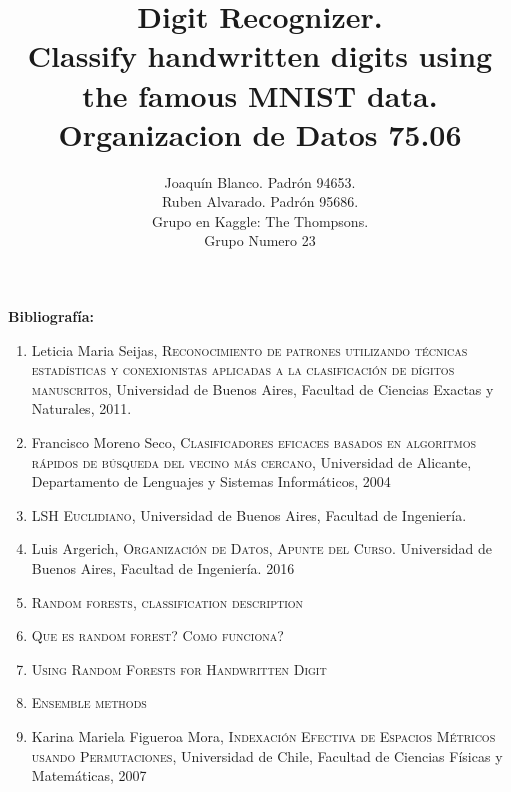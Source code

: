 \documentclass[a4paper,11pt]{report}
\title{Digit Recognizer. \\ 
  Classify handwritten digits using the famous MNIST data.\\
  Organizacion de Datos 75.06}
\author{Joaquín Blanco. Padrón 94653.\\
  Ruben Alvarado. Padrón 95686.\\
  Grupo en Kaggle: The Thompsons.\\
  Grupo Numero 23}
\begin{document}
\maketitle
\tableofcontents







\textbf{Bibliografía:}
\begin{enumerate}
  \item Leticia Maria Seijas, \textsc{Reconocimiento de patrones utilizando técnicas estadísticas y conexionistas aplicadas a la clasificación de dígitos manuscritos}, Universidad de Buenos Aires, Facultad de Ciencias Exactas y Naturales, 2011.
  \item Francisco Moreno Seco, \textsc{Clasificadores eficaces basados en algoritmos rápidos de búsqueda del vecino más cercano}, Universidad de Alicante, Departamento de Lenguajes y Sistemas Informáticos, 2004
  \item \textsc{LSH Euclidiano}, Universidad de Buenos Aires, Facultad de Ingeniería.
  \item Luis Argerich, \textsc{Organización de Datos, Apunte del Curso.} Universidad de Buenos Aires, Facultad de Ingeniería. 2016
  \item \textsc{Random forests, classification description} 
  \item \textsc{Que es random forest? Como funciona?}
  \item \textsc{Using Random Forests for Handwritten Digit}
  \item \textsc{Ensemble methods}
  \item Karina Mariela Figueroa Mora, \textsc{Indexación Efectiva de Espacios Métricos usando Permutaciones}, Universidad de Chile, Facultad de Ciencias Físicas y Matemáticas, 2007
\end{enumerate}
\end{document}
